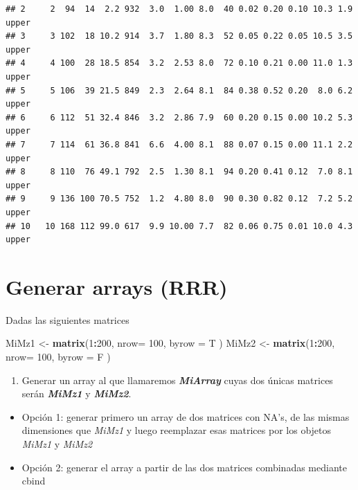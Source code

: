 \documentclass[]{book}
\newenvironment{Shaded}{\begin{snugshade}}{\end{snugshade}}
\newcommand{\DataTypeTok}[1]{\textcolor[rgb]{0.13,0.29,0.53}{#1}}
\newcommand{\DecValTok}[1]{\textcolor[rgb]{0.00,0.00,0.81}{#1}}
\newcommand{\KeywordTok}[1]{\textcolor[rgb]{0.13,0.29,0.53}{\textbf{#1}}}
\newcommand{\NormalTok}[1]{#1}
\newcommand{\OperatorTok}[1]{\textcolor[rgb]{0.81,0.36,0.00}{\textbf{#1}}}
\newcommand{\StringTok}[1]{\textcolor[rgb]{0.31,0.60,0.02}{#1}}
\providecommand{\tightlist}{%
  \setlength{\itemsep}{0pt}\setlength{\parskip}{0pt}}
\begin{document}
\begin{verbatim}
## 2     2  94  14  2.2 932  3.0  1.00 8.0  40 0.02 0.20 0.10 10.3 1.9 upper
## 3     3 102  18 10.2 914  3.7  1.80 8.3  52 0.05 0.22 0.05 10.5 3.5 upper
## 4     4 100  28 18.5 854  3.2  2.53 8.0  72 0.10 0.21 0.00 11.0 1.3 upper
## 5     5 106  39 21.5 849  2.3  2.64 8.1  84 0.38 0.52 0.20  8.0 6.2 upper
## 6     6 112  51 32.4 846  3.2  2.86 7.9  60 0.20 0.15 0.00 10.2 5.3 upper
## 7     7 114  61 36.8 841  6.6  4.00 8.1  88 0.07 0.15 0.00 11.1 2.2 upper
## 8     8 110  76 49.1 792  2.5  1.30 8.1  94 0.20 0.41 0.12  7.0 8.1 upper
## 9     9 136 100 70.5 752  1.2  4.80 8.0  90 0.30 0.82 0.12  7.2 5.2 upper
## 10   10 168 112 99.0 617  9.9 10.00 7.7  82 0.06 0.75 0.01 10.0 4.3 upper
\end{verbatim}

\hypertarget{generar-arrays-rrr}{%
\section{Generar arrays (RRR)}\label{generar-arrays-rrr}}

Dadas las siguientes matrices

\begin{Shaded}
\begin{Highlighting}[]
\NormalTok{MiMz1 <-}\StringTok{ }\KeywordTok{matrix}\NormalTok{(}\DecValTok{1}\OperatorTok{:}\DecValTok{200}\NormalTok{, }\DataTypeTok{nrow=} \DecValTok{100}\NormalTok{, }\DataTypeTok{byrow =}\NormalTok{ T )}
\NormalTok{MiMz2 <-}\StringTok{ }\KeywordTok{matrix}\NormalTok{(}\DecValTok{1}\OperatorTok{:}\DecValTok{200}\NormalTok{, }\DataTypeTok{nrow=} \DecValTok{100}\NormalTok{, }\DataTypeTok{byrow =}\NormalTok{ F )}
\end{Highlighting}
\end{Shaded}

\begin{enumerate}
\def\labelenumi{\arabic{enumi}.}
\tightlist
\item
  Generar un array al que llamaremos \textbf{\emph{MiArray}} cuyas dos únicas matrices serán \textbf{\emph{MiMz1}} y \textbf{\emph{MiMz2}}.
\end{enumerate}

\begin{itemize}
\tightlist
\item
  Opción 1: generar primero un array de dos matrices con NA's, de las mismas dimensiones que \emph{MiMz1} y luego reemplazar esas matrices por los objetos \emph{MiMz1} y \emph{MiMz2}
\item
  Opción 2: generar el array a partir de las dos matrices combinadas mediante cbind
\end{itemize}
\end{document}
